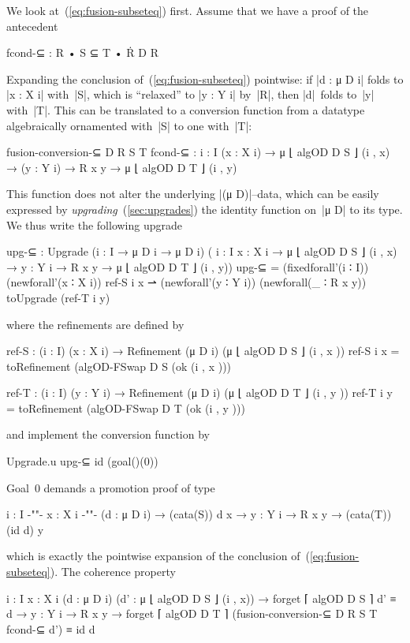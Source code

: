 We look at~(\ref{eq:fusion-subseteq}) first.
Assume that we have a proof of the antecedent
\begin{code}
fcond-⊆ : R • S ⊆ T • Ṙ D R
\end{code}
Expanding the conclusion of~(\ref{eq:fusion-subseteq}) pointwise: if |d : μ D i| folds to |x : X i| with~|S|, which is ``relaxed'' to |y : Y i| by~|R|, then |d|~folds to~|y| with~|T|.
This can be translated to a conversion function from a datatype algebraically ornamented with~|S| to one with~|T|:
\begin{code}
fusion-conversion-⊆ D R S T fcond-⊆ :
  {i : I} (x : X i) → μ ⌊ algOD D S ⌋ (i , x) →
  (y : Y i) → R x y → μ ⌊ algOD D T ⌋ (i , y)
\end{code}
This function does not alter the underlying |(μ D)|--data, which can be easily expressed by \emph{upgrading}~(\autoref{sec:upgrades}) the identity function on~|μ D| to its type.
We thus write the following upgrade
\begin{code}
upg-⊆ : Upgrade  ({i : I} → μ D i → μ D i)
                 (  {i : I} {x : X i} → μ ⌊ algOD D S ⌋ (i , x) →
                    {y : Y i} → R x y  → μ ⌊ algOD D T ⌋ (i , y))
upg-⊆ =  (fixedforall'(i ∶ I)) (newforall'(x ∶ X i)) ref-S i x ⇀ 
         (newforall'(y ∶ Y i)) (newforall(_ ∶ R x y)) toUpgrade (ref-T i y)
\end{code}
where the refinements are defined by
\begin{code}
ref-S  : (i : I) (x : X  i) → Refinement (μ D i) (μ ⌊ algOD D S  ⌋ (i , x  ))
ref-S   i x  = toRefinement (algOD-FSwap D S  (ok (i , x  )))

ref-T  : (i : I) (y : Y  i) → Refinement (μ D i) (μ ⌊ algOD D T  ⌋ (i , y  ))
ref-T   i y  = toRefinement (algOD-FSwap D T  (ok (i , y  )))
\end{code}
and implement the conversion function by
\begin{code}
Upgrade.u upg-⊆ id (goal()(0))
\end{code}
Goal~0 demands a promotion proof of type
\begin{code}
{i : I} {-"\kern-1pt"-} {x : X i} {-"\kern-1pt"-} (d : μ D i) → (cata(S)) d x → {y : Y i} → R x y → (cata(T)) (id d) y
\end{code}
which is exactly the pointwise expansion of the conclusion of~(\ref{eq:fusion-subseteq}).
The coherence property
\begin{code}
{i : I} {x : X i} (d : μ D i) (d' : μ ⌊ algOD D S ⌋ (i , x)) →
  forget ⌈ algOD D S ⌉ d' ≡ d →
{y : Y i} → R x y →
  forget ⌈ algOD D T ⌉ (fusion-conversion-⊆ D R S T fcond-⊆ d') ≡ id d
\end{code}
